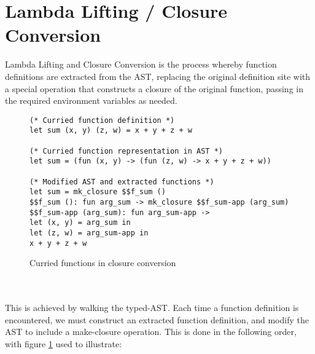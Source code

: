 \documentclass[12pt,twoside,notitlepage]{report}
\newcommand\note[1]{\textcolor{blue}{#1}}
\begin{document}
\section{Lambda Lifting / Closure Conversion}

Lambda Lifting and Closure Conversion is the process whereby function definitions are extracted from the AST, replacing the original definition site with a special operation that constructs a closure of the original function, passing in the required environment variables as needed.
\begin{figure}[h]
	\begin{verbatim}
(* Curried function definition *)
let sum (x, y) (z, w) = x + y + z + w

(* Curried function representation in AST *)
let sum = (fun (x, y) -> (fun (z, w) -> x + y + z + w))

(* Modified AST and extracted functions *)
let sum = mk_closure $$f_sum ()
$$f_sum (): fun arg_sum -> mk_closure $$f_sum-app (arg_sum)
$$f_sum-app (arg_sum): fun arg_sum-app ->
let (x, y) = arg_sum in
let (z, w) = arg_sum-app in
x + y + z + w
	\end{verbatim}
	\caption{Curried functions in closure conversion}
	\label{fig:curried}
\end{figure}
\\\\
This is achieved by walking the typed-AST. Each time a function definition is encountered, we must construct an extracted function definition, and modify the AST to include a make-closure operation. This is done in the following order, with figure \ref{fig:curried} used to illustrate:
\end{document}
